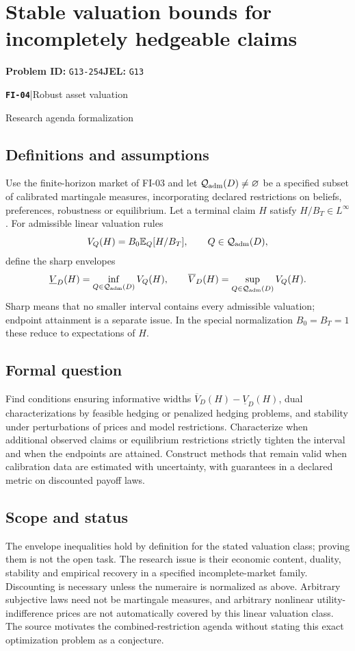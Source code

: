 \documentclass[11pt,a4paper]{article}
\newcommand{\E}{\mathbb E}
\newcommand{\entrymeta}[3]{{\sffamily\small\color{muted}\textbf{\texttt{#1}}\quad|\quad #2\par #3\par}}
\begin{document}
\section*{Stable valuation bounds for incompletely hedgeable claims}
\textbf{Problem ID:} \texttt{G13-254}\quad \textbf{JEL:} \texttt{G13}\par
\label{problem:OP-0581}
\label{beyond:FI-04}
\entrymeta{FI-04}{Robust asset valuation}{Research agenda formalization}
\subsection*{Definitions and assumptions}
Use the finite-horizon market of FI-03 and let $\mathcal Q_{\rm adm}(D)\ne\varnothing$ be a specified subset of calibrated martingale measures, incorporating declared restrictions on beliefs, preferences, robustness or equilibrium. Let a terminal claim $H$ satisfy $H/B_T\in L^\infty$. For admissible linear valuation rules
\[
 V_Q(H)=B_0\E_Q[H/B_T],\qquad Q\in\mathcal Q_{\rm adm}(D),
\]
define the sharp envelopes
\[
 \underline V_D(H)=\inf_{Q\in\mathcal Q_{\rm adm}(D)}V_Q(H),\qquad
 \overline V_D(H)=\sup_{Q\in\mathcal Q_{\rm adm}(D)}V_Q(H).
\]
Sharp means that no smaller interval contains every admissible valuation; endpoint attainment is a separate issue. In the special normalization $B_0=B_T=1$ these reduce to expectations of $H$.
\subsection*{Formal question}
Find conditions ensuring informative widths $\overline V_D(H)-\underline V_D(H)$, dual characterizations by feasible hedging or penalized hedging problems, and stability under perturbations of prices and model restrictions. Characterize when additional observed claims or equilibrium restrictions strictly tighten the interval and when the endpoints are attained. Construct methods that remain valid when calibration data are estimated with uncertainty, with guarantees in a declared metric on discounted payoff laws.
\subsection*{Scope and status}
The envelope inequalities hold by definition for the stated valuation class; proving them is not the open task. The research issue is their economic content, duality, stability and empirical recovery in a specified incomplete-market family. Discounting is necessary unless the numeraire is normalized as above. Arbitrary subjective laws need not be martingale measures, and arbitrary nonlinear utility-indifference prices are not automatically covered by this linear valuation class. The source motivates the combined-restriction agenda without stating this exact optimization problem as a conjecture.
\end{document}
